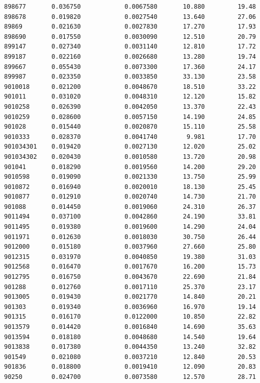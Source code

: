 \documentclass[
  letterpaper,
  DIV=11,
  numbers=noendperiod]{scrartcl}
\begin{document}
\begin{verbatim}
898677       0.036750            0.0067580       10.880         19.48
898678       0.019820            0.0027540       13.640         27.06
89869        0.021630            0.0027830       17.270         17.93
898690       0.017550            0.0030090       12.510         20.79
899147       0.027340            0.0031140       12.810         17.72
899187       0.022160            0.0026680       13.280         19.74
899667       0.055430            0.0073300       17.360         24.17
899987       0.023350            0.0033850       33.130         23.58
9010018      0.021200            0.0048670       18.510         33.22
901011       0.031020            0.0048310       12.120         15.82
9010258      0.026390            0.0042050       13.370         22.43
9010259      0.028600            0.0057150       14.190         24.85
901028       0.015440            0.0020870       15.110         25.58
9010333      0.028370            0.0041740        9.981         17.70
901034301    0.019420            0.0027130       12.020         25.02
901034302    0.020430            0.0010580       13.720         20.98
901041       0.018290            0.0019560       14.200         29.20
9010598      0.019090            0.0021330       13.750         25.99
9010872      0.016940            0.0020010       18.130         25.45
9010877      0.012910            0.0020740       14.730         21.70
901088       0.014450            0.0019060       24.310         26.37
9011494      0.037100            0.0042860       24.190         33.81
9011495      0.019380            0.0019600       14.290         24.04
9011971      0.012630            0.0018030       30.750         26.44
9012000      0.015180            0.0037960       27.660         25.80
9012315      0.031970            0.0040850       19.380         31.03
9012568      0.016470            0.0017670       16.200         15.73
9012795      0.016750            0.0043670       22.690         21.84
901288       0.012760            0.0017110       25.370         23.17
9013005      0.019430            0.0021770       14.840         20.21
901303       0.019340            0.0036960       16.970         19.14
901315       0.016170            0.0122000       10.850         22.82
9013579      0.014420            0.0016840       14.690         35.63
9013594      0.018180            0.0048680       14.540         19.64
9013838      0.017380            0.0044350       13.240         32.82
901549       0.021080            0.0037210       12.840         20.53
901836       0.018800            0.0019410       12.090         20.83
90250        0.024700            0.0073580       12.570         28.71

\end{verbatim}
\end{document}
